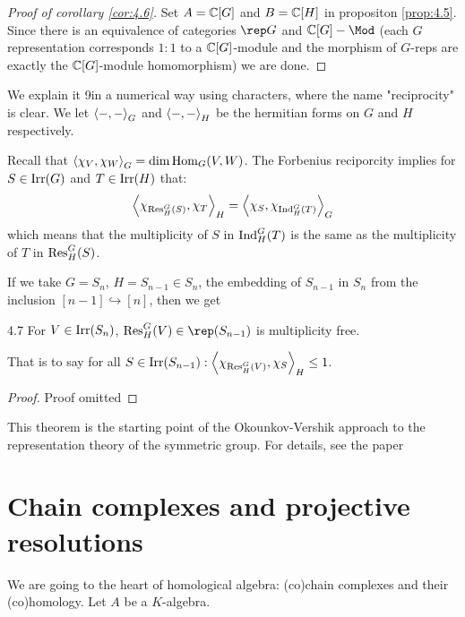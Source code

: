\documentclass[twoside = false,	%
		headsepline,		%
		parskip = true,
		]{scrbook}						%
\begin{document}
        \begin{proof}[Proof of corollary \ref{cor:4.6}]
            Set $A = \mathbb C[G]$ and $B = \mathbb C[H]$ in propositon \ref{prop:4.5}. Since there is an equivalence of categories $\rep G$ and $ \C[G]-\Mod$ (each $G$ representation corresponds $1:1$ to a $\mathbb C[G]$-module and the morphism of $G$-reps are exactly the $\mathbb C[G]$-module homomorphism) we are done.
        \end{proof}

        We explain it 9in a numerical way using characters, where the name "reciprocity" is clear. We let $\left\langle -,-\right\rangle_G$ and $\left\langle -,-\right\rangle_H$ be the hermitian forms on $G$ and $H$ respectively.
        
        Recall that $\left\langle \chi_V,\chi_W\right\rangle_G = \dim \mathrm{Hom}_G(V,W)$. The Forbenius reciporcity implies for $S \in \mathrm{Irr}(G)$ and $T \in \mathrm{Irr}(H)$ that:
        \begin{equation*}
            \left\langle \chi_{\mathrm{Res}_H^G(S)},\chi_T\right\rangle_H = \left\langle \chi_S,\chi_{\mathrm{Ind}_H^G(T)}\right\rangle_G
        \end{equation*}
        which means that the multiplicity of $S$ in $\mathrm{Ind}_H^G(T)$ is the same as the multiplicity of $T$ in $\mathrm{Res}_H^G(S)$.

        If we take $G=S_n$, $H = S_{n-1} \in S_n$, the embedding of $S_{n-1}$ in $S_n$ from the inclusion $[n-1] \hookrightarrow [n]$, then we get
        \begin{theorem}{}{4.7}
            For $V \in \mathrm{Irr}(S_n)$, $\Res_H^G(V) \in \rep(S_{n-1})$ is multiplicity free.

            That is to say for all $S \in \mathrm{Irr}(S_{n-1}): \left\langle \chi_{\mathrm{Res}_H^G(V)},\chi_S\right\rangle_H \leq 1$.
        \end{theorem}

        \begin{proof}{Proof omitted}
        \end{proof}

        This theorem is the starting point of the Okounkov-Vershik approach to the representation theory of the symmetric group. For details, see the paper \cite{VershikOkounkov.2005}

\section{Chain complexes and projective resolutions}
    We are going to the heart of homological algebra: (co)chain complexes and their (co)homology. Let $A$ be a $K$-algebra.
\end{document}
